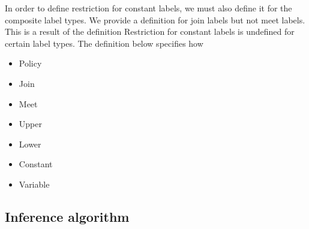 In order to define restriction for constant labels, we must also define it for the composite label types.
We provide a definition for join labels but not meet labels.
This is a result of the definition 
Restriction for constant labels is undefined for certain label types.
The definition below specifies how 

\begin{itemize}
  \item Policy
  \item Join
  \item Meet
  \item Upper
  \item Lower
  \item Constant
  \item Variable
\end{itemize}

\subsection{Inference algorithm}\label{dlm:inf:algsection}
